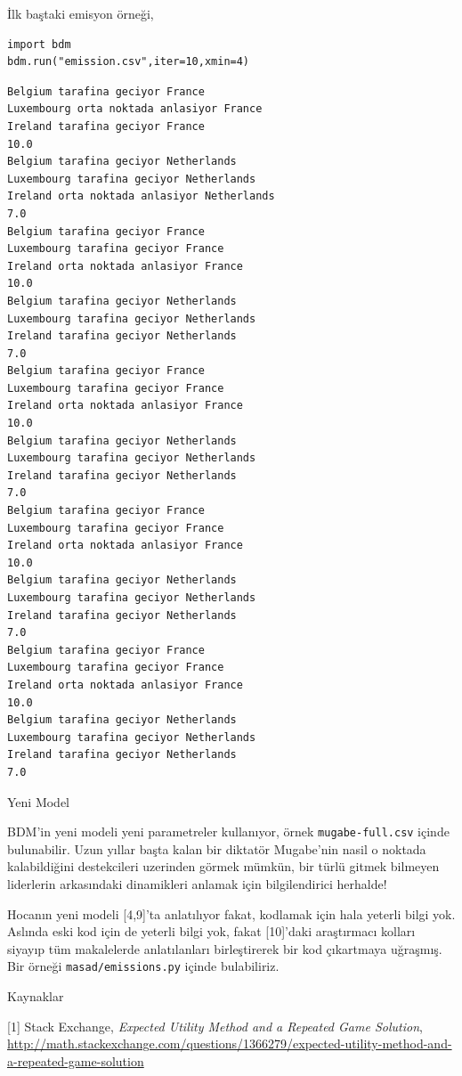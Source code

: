 \documentclass[12pt,fleqn]{article}\usepackage{../../common}
\begin{document}
İlk baştaki emisyon örneği,

\begin{verbatim}
import bdm
bdm.run("emission.csv",iter=10,xmin=4)
\end{verbatim}

\begin{verbatim}
Belgium tarafina geciyor France
Luxembourg orta noktada anlasiyor France
Ireland tarafina geciyor France
10.0
Belgium tarafina geciyor Netherlands
Luxembourg tarafina geciyor Netherlands
Ireland orta noktada anlasiyor Netherlands
7.0
Belgium tarafina geciyor France
Luxembourg tarafina geciyor France
Ireland orta noktada anlasiyor France
10.0
Belgium tarafina geciyor Netherlands
Luxembourg tarafina geciyor Netherlands
Ireland tarafina geciyor Netherlands
7.0
Belgium tarafina geciyor France
Luxembourg tarafina geciyor France
Ireland orta noktada anlasiyor France
10.0
Belgium tarafina geciyor Netherlands
Luxembourg tarafina geciyor Netherlands
Ireland tarafina geciyor Netherlands
7.0
Belgium tarafina geciyor France
Luxembourg tarafina geciyor France
Ireland orta noktada anlasiyor France
10.0
Belgium tarafina geciyor Netherlands
Luxembourg tarafina geciyor Netherlands
Ireland tarafina geciyor Netherlands
7.0
Belgium tarafina geciyor France
Luxembourg tarafina geciyor France
Ireland orta noktada anlasiyor France
10.0
Belgium tarafina geciyor Netherlands
Luxembourg tarafina geciyor Netherlands
Ireland tarafina geciyor Netherlands
7.0
\end{verbatim}

Yeni Model

BDM'in yeni modeli yeni parametreler kullanıyor, örnek \verb!mugabe-full.csv!
içinde bulunabilir. Uzun yıllar başta kalan bir diktatör Mugabe'nin nasil o
noktada kalabildiğini destekcileri uzerinden görmek mümkün, bir türlü gitmek
bilmeyen liderlerin arkasındaki dinamikleri anlamak için bilgilendirici
herhalde!

Hocanın yeni modeli [4,9]'ta anlatılıyor fakat, kodlamak için hala yeterli bilgi
yok. Aslında eski kod için de yeterli bilgi yok, fakat [10]'daki araştırmacı
kolları siyayıp tüm makalelerde anlatılanları birleştirerek bir kod çıkartmaya
uğraşmış. Bir örneği \verb!masad/emissions.py!  içinde bulabiliriz.

Kaynaklar 

[1] Stack Exchange, {\em Expected Utility Method and a Repeated Game Solution}, \url{http://math.stackexchange.com/questions/1366279/expected-utility-method-and-a-repeated-game-solution}
\end{document}
